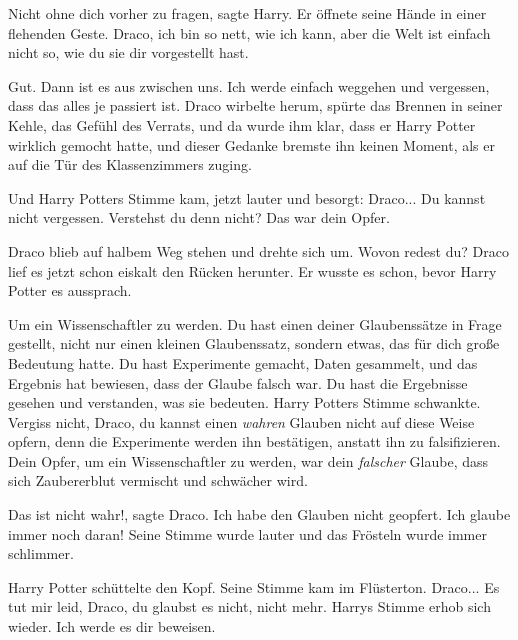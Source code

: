 \glqq Nicht ohne dich vorher zu fragen\grqq{}, sagte Harry. Er öffnete seine
Hände in einer flehenden Geste. \glqq Draco, ich bin so nett, wie ich kann, aber
die Welt ist einfach nicht so, wie du sie dir vorgestellt hast.\grqq{}

\glqq Gut. Dann ist es aus zwischen uns. Ich werde einfach weggehen und
vergessen, dass das alles je passiert ist.\grqq{} Draco wirbelte herum, spürte
das Brennen in seiner Kehle, das Gefühl des Verrats, und da wurde ihm klar, dass
er Harry Potter wirklich gemocht hatte, und dieser Gedanke bremste ihn keinen
Moment, als er auf die Tür des Klassenzimmers zuging.

Und Harry Potters Stimme kam, jetzt lauter und besorgt: \glqq Draco... Du kannst
nicht vergessen. Verstehst du denn nicht? Das war dein Opfer.\grqq{}

Draco blieb auf halbem Weg stehen und drehte sich um. \glqq Wovon redest
du?\grqq{} Draco lief es jetzt schon eiskalt den Rücken herunter. Er wusste es
schon, bevor Harry Potter es aussprach.

\glqq Um ein Wissenschaftler zu werden. Du hast einen deiner Glaubenssätze in
Frage gestellt, nicht nur einen kleinen Glaubenssatz, sondern etwas, das für
dich große Bedeutung hatte. Du hast Experimente gemacht, Daten gesammelt, und
das Ergebnis hat bewiesen, dass der Glaube falsch war. Du hast die Ergebnisse
gesehen und verstanden, was sie bedeuten.\grqq{} Harry Potters Stimme schwankte.
\glqq Vergiss nicht, Draco, du kannst einen \emph{wahren} Glauben nicht auf
diese Weise opfern, denn die Experimente werden ihn bestätigen, anstatt ihn zu
falsifizieren. Dein Opfer, um ein Wissenschaftler zu werden, war dein
\emph{falscher} Glaube, dass sich Zaubererblut vermischt und schwächer
wird.\grqq{}

\glqq Das ist nicht wahr!\grqq{}, sagte Draco. \glqq Ich habe den Glauben nicht
geopfert. Ich glaube immer noch daran!\grqq{} Seine Stimme wurde lauter und das
Frösteln wurde immer schlimmer.

Harry Potter schüttelte den Kopf. Seine Stimme kam im Flüsterton. \glqq Draco...
Es tut mir leid, Draco, du glaubst es nicht, nicht mehr.\grqq{} Harrys Stimme
erhob sich wieder. \glqq Ich werde es dir beweisen.

